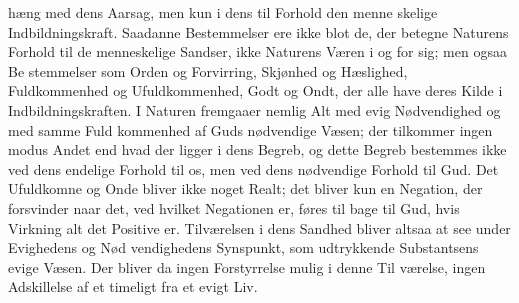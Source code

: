 \documentclass[12pt,a4paper]{book}
\begin{document}
hæng med dens Aarsag, men kun i dens til Forhold den menne\-%
skelige Indbildningskraft. Saadanne Bestemmelser ere ikke
blot de, der betegne Naturens Forhold til de menneskelige
Sandser, ikke Naturens Væren i og for sig; men ogsaa Be\-%
stemmelser som Orden og Forvirring, Skjønhed og Hæslighed,
Fuldkommenhed og Ufuldkommenhed, Godt og Ondt, der alle
have deres Kilde i Indbildningskraften. I Naturen fremgaaer
nemlig Alt med evig Nødvendighed og med samme Fuld\-%
kommenhed af Guds nødvendige Væsen; der tilkommer ingen
modus Andet end hvad der ligger i dens Begreb, og dette
Begreb bestemmes ikke ved dens endelige Forhold til os, men
ved dens nødvendige Forhold til Gud. Det Ufuldkomne og
Onde bliver ikke noget Realt; det bliver kun en Negation,
der forsvinder naar det, ved hvilket Negationen er, føres til\-%
bage til Gud, hvis Virkning alt det Positive er. Tilværelsen
i dens Sandhed bliver altsaa at see under Evighedens og Nød\-%
vendighedens Synspunkt, som udtrykkende Substantsens evige
Væsen. Der bliver da ingen Forstyrrelse mulig i denne Til\-%
værelse, ingen Adskillelse af et timeligt fra et evigt Liv.
\end{document}
